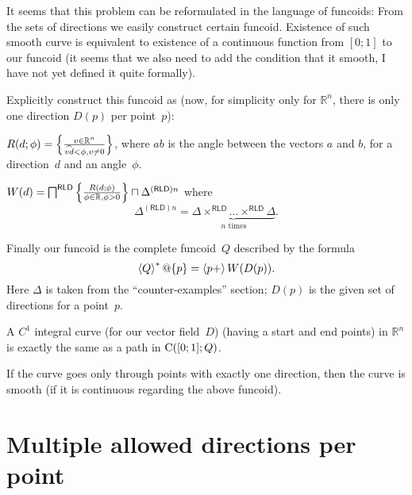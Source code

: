 It seems that this problem can be reformulated in the language of funcoids: From the sets of directions we easily construct certain funcoid.
Existence of such smooth curve is equivalent to existence of a continuous function from $[0;1]$ to our funcoid (it seems that we also need to add the
condition that it smooth, I have not yet defined it quite formally).

Explicitly construct this funcoid as (now, for simplicity only for $\mathbb{R}^n$, there is only one direction $D(p)$ per point~$p$):

$R(d;\phi) = \left\{ \frac{v\in\mathbb{R}^n}{\widehat{vd}<\phi, v\ne 0}\right\}$,
where $\widehat{ab}$ is the angle between the vectors $a$ and $b$,
for a direction~$d$ and an angle~$\phi$.

$W(d) = \bigsqcap^{\mathsf{RLD}}\left\{ \frac{R(d;\phi)}{\phi\in\mathbb{R},\phi>0}\right\} \sqcap \Delta^{(\mathsf{RLD})n}$
where \[ \Delta^{(\mathsf{RLD})n} = \underbrace{\Delta\times^{\mathsf{RLD}}\dots\times^{\mathsf{RLD}}\Delta}_{n\text{ times}}. \]

Finally our funcoid is the complete funcoid~$Q$ described by the formula
\[ \left\langle Q\right\rangle ^{\ast}@\{p\} = \left\langle p+\right\rangle W(D(p)). \]
Here $\Delta$ is taken from the ``counter-examples'' section;
$D(p)$ is the given set of directions for a point~$p$.

\begin{thm}
A $C^1$ integral curve (for our vector field~$D$) (having a start and end points) in $\mathbb{R}^n$ is exactly the same as a path in $\mathrm{C}([0;1]; Q)$.
\end{thm}

\begin{conjecture}
If the curve goes only through points with exactly one direction, then the curve is smooth (if it is continuous regarding the above funcoid).
\end{conjecture}


\section{Multiple allowed directions per point}

